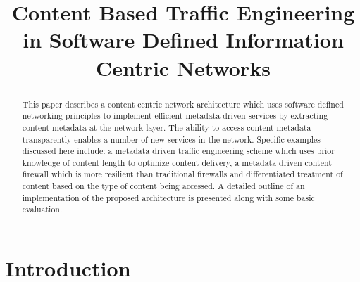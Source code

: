 \documentclass[conference]{IEEEtran}
\begin{document}
\title{Content Based Traffic Engineering in Software Defined Information Centric Networks}




\author{
\and
{}
\and
{}
}
\maketitle


\begin{abstract}
This paper describes a content centric network
architecture which uses software defined networking principles
to implement efficient metadata driven services by extracting
content metadata at the network layer. The ability to access
content metadata transparently enables a number of new services
in the network. Specific examples discussed here include: a
metadata driven traffic engineering scheme which uses prior
knowledge of content length to optimize content delivery, a
metadata driven content firewall which is more resilient than
traditional firewalls and differentiated treatment of content based
on the type of content being accessed. A detailed outline of an
implementation of the proposed architecture is presented along
with some basic evaluation.
\end{abstract}
\IEEEpeerreviewmaketitle

\section{Introduction}
\label{sec:intro}
\end{document}
